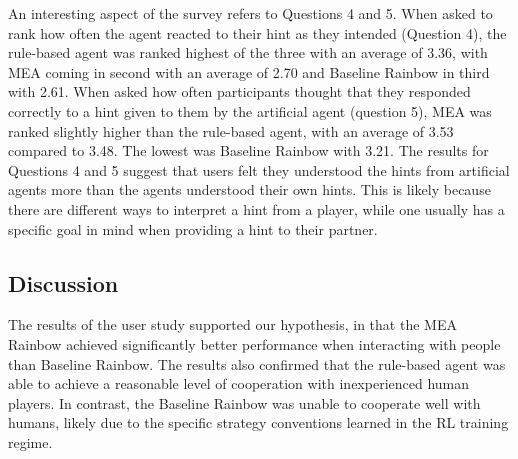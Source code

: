 \documentclass[letterpaper]{article} %
\begin{document}
An interesting aspect of the survey refers to Questions 4 and 5.
When asked to rank how often the agent reacted to their hint as they intended (Question 4), the rule-based agent was ranked highest of the three with an average of 3.36, with MEA coming in second with an average of 2.70 and Baseline Rainbow in third with 2.61. %
When asked  how often participants thought that they responded correctly to a hint given to them by the artificial agent (question 5), MEA was ranked slightly higher than the rule-based agent, with an average of 3.53 compared to 3.48. The lowest was Baseline Rainbow with 3.21.
The results for Questions 4 and 5 suggest that users felt they understood the  hints from artificial agents more than the agents understood their own hints. This is likely because there are different ways to interpret a hint from a player, while one usually has a specific goal in mind when providing a hint to their partner.




\subsection{Discussion}

The results of the user study supported our hypothesis, in that the MEA Rainbow achieved significantly better performance when interacting
with people than Baseline Rainbow.
The results also confirmed that the rule-based agent was able to achieve a reasonable level of cooperation with inexperienced human players.  In contrast, the Baseline Rainbow was unable to cooperate well with humans, likely due to the specific strategy conventions learned in the RL training regime.
\end{document}

